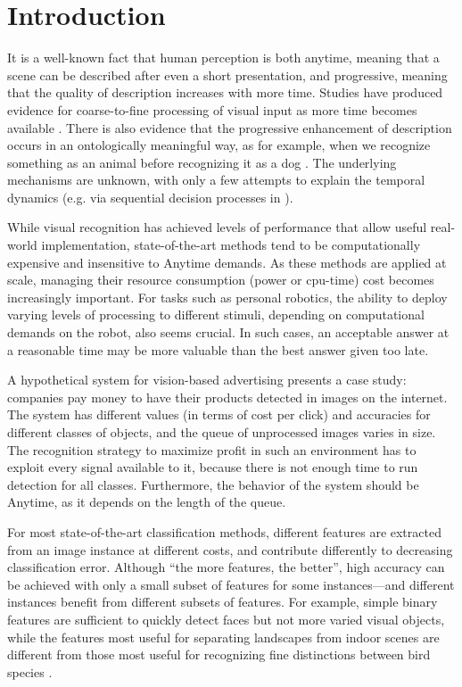 \chapter{Introduction}\label{sec:introduction}

It is a well-known fact that human perception is both anytime, meaning that a scene can be described after even a short presentation, and progressive, meaning that the quality of description increases with more time.
Studies have produced evidence for coarse-to-fine processing of visual input as more time becomes available \parencite{Vanrullen-1996,Fei-Fei-Vision-2007}.
There is also evidence that the progressive enhancement of description occurs in an ontologically meaningful way, as for example, when we recognize something as an animal before recognizing it as a dog \parencite{Mace-PloS-2009}.
The underlying mechanisms are unknown, with only a few attempts to explain the temporal dynamics (e.g. via sequential decision processes in \textcite{Hegde-Neuro-2008}).

While visual recognition has achieved levels of performance that allow useful real-world implementation, state-of-the-art methods tend to be computationally expensive and insensitive to Anytime demands.
As these methods are applied at scale, managing their resource consumption (power or cpu-time) cost becomes increasingly important.
For tasks such as personal robotics, the ability to deploy varying levels of processing to different stimuli, depending on computational demands on the robot, also seems crucial.
In such cases, an acceptable answer at a reasonable time may be more valuable than the best answer given too late.

A hypothetical system for vision-based advertising presents a case study: companies pay money to have their products detected in images on the internet.
The system has different values (in terms of cost per click) and accuracies for different classes of objects, and the queue of unprocessed images varies in size.
The recognition strategy to maximize profit in such an environment has to exploit every signal available to it, because there is not enough time to run detection for all classes.
Furthermore, the behavior of the system should be Anytime, as it depends on the length of the queue.

For most state-of-the-art classification methods, different features are extracted from an image instance at different costs, and contribute differently to decreasing classification error.
Although ``the more features, the better'', high accuracy can be achieved with only a small subset of features for some instances---and different instances benefit from different subsets of features.
For example, simple binary features are sufficient to quickly detect faces \parencite{Viola2004} but not more varied visual objects, while the features most useful for separating landscapes from indoor scenes \parencite{Xiao-CVPR-2010} are different from those most useful for recognizing fine distinctions between bird species \parencite{Farrell-ICCV-2011}.

